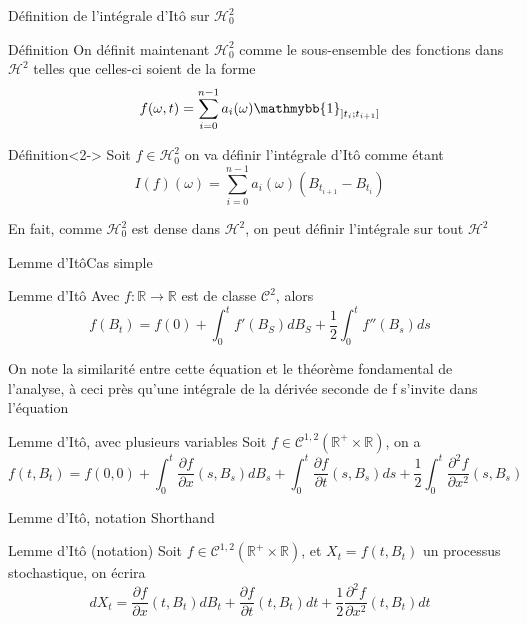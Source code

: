 \documentclass{beamer}
\newcommand{\1}{\mathmybb{1}}
\begin{document}
 \begin{frame}{Définition de l'intégrale d'Itô sur $\mathcal{H}^2_0$}
      \begin{block}{Définition}
     On définit maintenant $\mathcal{H}^{2}_{0}$ comme le sous-ensemble des fonctions dans $\mathcal{H}^{2}$ telles que celles-ci soient de la forme 
     \[
       f(\omega, t) = \sum_{i=0}^{n-1}a_{i}(\omega) \1_{\left] t_{i} ; t_{i+1} \right] }
     \]
     \end{block}
     \begin{block}{Définition}<2->
       Soit $ f \in \mathcal{H}^{2}_{0} $ on va définir l'intégrale d'Itô comme étant
       \[
         I(f)(\omega) = \sum_{i=0}^{n-1} a_{i}(\omega)\left( B_{t_{i+1}} - B_{t_{i}} \right)
       \]
     \end{block}
     \pause
   En fait, comme $ \mathcal{H}^{2}_{0}$ est dense dans $\mathcal{H}^{2}$, on peut définir l'intégrale sur tout $\mathcal{H}^2$
   \end{frame}
   \begin{frame}{Lemme d'Itô}{Cas simple}
     \begin{block}{Lemme d'Itô}
       Avec $f: \mathbb{R} \rightarrow \mathbb{R} $ est de classe $ \mathcal{C}^{2} $, alors
       \begin{equation}
         f(B_{t}) = f(0) + \int_{0}^{t}f'(B_{S})dB_{S} + \frac{1}{2}\int_{0}^{t} f''(B_{s})ds
       \end{equation}
     \end{block}
     \pause
     On note la similarité entre cette équation et le théorème fondamental de l'analyse, à ceci près qu'une intégrale de la dérivée seconde de f s'invite dans l'équation
     \pause
     \begin{block}{Lemme d'Itô, avec plusieurs variables}
       Soit $f\in \mathcal{C}^{1, 2}(\mathbb{R}^{+} \times \mathbb{R})$, on a
       \begin{equation}
           f(t, B_{t}) = f(0, 0) + \int_{0}^{t}\frac{\partial f}{\partial x}(s, B_{s}) dB_{s} + \int_{0}^{t}\frac{\partial f}{\partial t}(s, B_{s}) ds + \frac{1}{2} \int_{0}^{t}\frac{\partial ^{2} f}{\partial x^{2}}(s, B_{s})
         \end{equation}
         \end{block}
     \end{frame}
     \begin{frame}{Lemme d'Itô, notation Shorthand}
       \begin{block}{Lemme d'Itô (notation)}
         Soit $f\in \mathcal{C}^{1, 2}(\mathbb{R}^{+} \times \mathbb{R})$, et $ X_{t} = f(t, B_{t})$ un processus stochastique, on écrira
         \begin{equation}
           dX_{t} = \frac{\partial f}{\partial x}(t, B_{t}) dB_{t} + \frac{\partial f}{\partial t}(t, B_{t}) dt + \frac{1}{2} \frac{\partial^{2}f}{\partial x^{2}}(t, B_{t}) dt
         \end{equation}
       \end{block}
     \end{frame}
\end{document}
